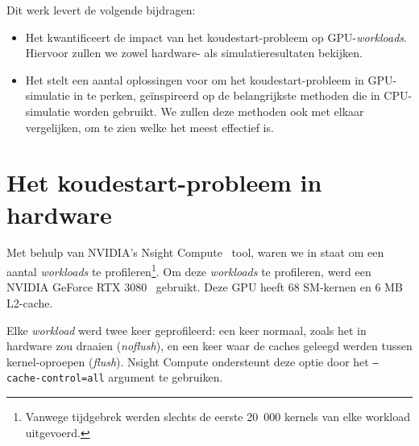 \documentclass[5p,numvwe]{elsarticle}
\begin{document}
    Dit werk levert de volgende bijdragen:
    \begin{itemize}
        \item Het kwantificeert de impact van het koudestart-probleem op GPU-\textit{workloads}.
        Hiervoor zullen we zowel hardware- als simulatieresultaten bekijken.
        \item Het stelt een aantal oplossingen voor om het koudestart-probleem in GPU-simulatie in te perken, geïnspireerd op de belangrijkste methoden die in CPU-simulatie worden gebruikt.
        We zullen deze methoden ook met elkaar vergelijken, om te zien welke het meest effectief is.
    \end{itemize}

    \section{Het koudestart-probleem in hardware}\label{sec:hw}
    Met behulp van NVIDIA's Nsight Compute~\cite{nsight} tool, waren we in staat om een aantal \textit{workloads} te profileren\footnote{Vanwege tijdgebrek werden slechts de eerste 20\ 000 kernels van elke workload uitgevoerd.}.
    Om deze \textit{workloads} te profileren, werd een NVIDIA GeForce RTX 3080~\cite{nvidia-wp} gebruikt.
    Deze GPU heeft 68 SM-kernen en 6 MB L2-cache.

    Elke \textit{workload} werd twee keer geprofileerd: een keer normaal, zoals het in hardware zou draaien (\textit{noflush}), en een keer waar de caches geleegd werden tussen kernel-oproepen (\textit{flush}).
    Nsight Compute ondersteunt deze optie door het \texttt{--cache-control=all} argument te gebruiken.
\end{document}
